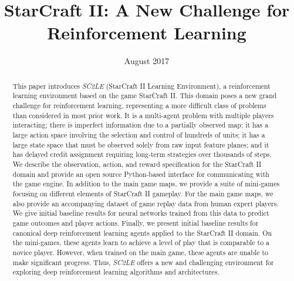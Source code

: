 \documentclass{article}
\title{StarCraft II: A New Challenge for\\ Reinforcement Learning}
\date{August 2017}
\begin{document}
\frenchspacing 

\maketitle


{\bf{}}

\vskip 0.3in
\begin{abstract}
This paper introduces \emph{SC2LE} (StarCraft II Learning Environment), a reinforcement learning environment based on the game StarCraft II. This domain poses a new grand challenge for reinforcement learning, representing a more difficult class of problems than considered in most prior work. It is a multi-agent problem with multiple players interacting; there is imperfect information due to a partially observed map; it has a large action space involving the selection and control of hundreds of units; it has a large state space that must be observed solely from raw input feature planes; and it has delayed credit assignment requiring long-term strategies over thousands of steps. We describe the observation, action, and reward specification for the StarCraft II domain and provide an open source Python-based interface for communicating with the game engine. In addition to the main game maps, we provide a suite of mini-games focusing on different elements of StarCraft II gameplay.
For the main game maps, we also provide an accompanying dataset of game replay data from human expert players. We give initial baseline results for neural networks trained from this data to predict game outcomes and player actions.
Finally, we present initial baseline results for canonical deep reinforcement learning agents applied to the StarCraft II domain. On the mini-games, these agents learn to achieve a level of play that is comparable to a novice player. However, when trained on the main game, these agents are unable to make significant progress. Thus, \emph{SC2LE} offers a new and challenging environment for exploring deep reinforcement learning algorithms and architectures.
\end{abstract}
\end{document}
